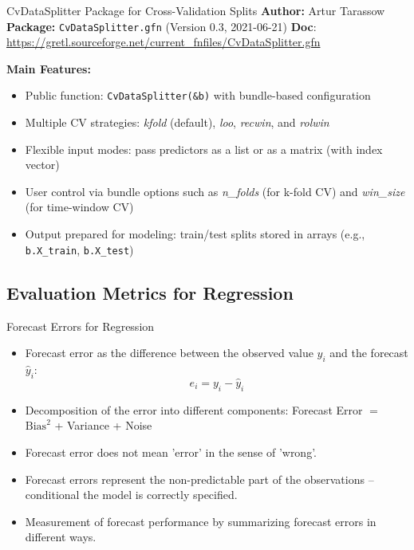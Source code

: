 \documentclass[11pt]{beamer}
\begin{document}
\begin{frame}{CvDataSplitter Package for Cross-Validation Splits}
	\small
		\textbf{Author:} Artur Tarassow \\
	\textbf{Package:} \texttt{CvDataSplitter.gfn} (Version 0.3, 2021-06-21)
	\textbf{Doc}: \url{https://gretl.sourceforge.net/current_fnfiles/CvDataSplitter.gfn}
	\vspace{0.1cm}

	\textbf{Main Features:}
	\begin{itemize}
		\item Public function: \texttt{CvDataSplitter(\&b)} with bundle-based configuration
		\item Multiple CV strategies: \textit{kfold} (default), \textit{loo}, \textit{recwin}, and \textit{rolwin}
		\item Flexible input modes: pass predictors as a list or as a matrix (with index vector)
		\item User control via bundle options such as \textit{n\_folds} (for k-fold CV) and \textit{win\_size} (for time-window CV)
		\item Output prepared for modeling: train/test splits stored in arrays (e.g., \texttt{b.X\_train}, \texttt{b.X\_test})
	\end{itemize}
\end{frame}


\subsection{Evaluation Metrics for Regression}

\begin{frame}{Forecast Errors for Regression}
    \begin{itemize}
        \item Forecast error as the difference between the observed value $y_i$ and the forecast $\hat y_i$:
        \begin{equation}
            e_i = y_i - \hat y_i
        \end{equation}
        \item Decomposition of the error into different components: Forecast Error $=$ $\text{Bias}^2$ + Variance + Noise
        \item Forecast error does not mean 'error' in the sense of 'wrong'.
        \item Forecast errors represent the non-predictable part of the observations -- conditional the model is correctly specified.
        \item Measurement of forecast performance by summarizing forecast errors in different ways.
    \end{itemize}
\end{frame}
\end{document}
